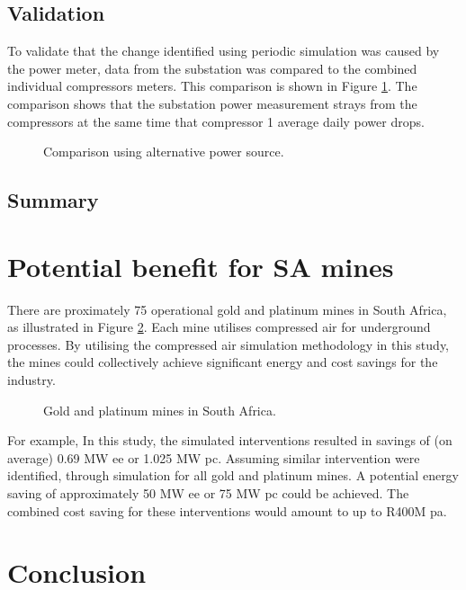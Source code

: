    \subsection{Validation}
To validate that the change identified using periodic simulation was caused by the power meter, data from the substation was compared to the combined individual compressors meters. This comparison is shown in Figure \ref{fig: Corrected Periodic simulation}. The comparison shows that the substation power measurement strays from the compressors at the same time that compressor 1 average daily power drops.
	\begin{figure}[h]
		\centering
		
		\caption{Comparison using alternative power source.}
		\label{fig: Corrected Periodic simulation}
	\end{figure}    
	
	\subsection{Summary}
\newpage
\section{Potential benefit for SA mines}
There are proximately 75 operational gold and platinum mines in South Africa, as illustrated in Figure \ref{fig: Mine map}. Each mine utilises compressed air for underground processes. By utilising the compressed air simulation methodology in this study, the mines could collectively achieve significant energy and cost savings for the industry. 
\par 

	\begin{figure}[h]
		\centering
		\caption{Gold and platinum mines in South Africa.}
		\label{fig: Mine map}
	\end{figure}
For example, In this study, the simulated interventions resulted in savings of (on average) 0.69 MW \gls{ee} or 1.025 MW \gls{pc}. Assuming similar intervention were identified, through simulation for all gold and platinum mines. A potential energy saving of approximately 50 MW \gls{ee} or  75 MW \gls{pc} could be achieved. The combined cost saving for these interventions would amount to up to R400M \gls{pa}.

\section{Conclusion}